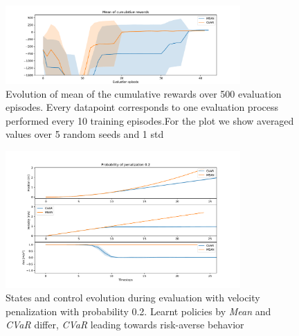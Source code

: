 \begin{figure}[ht]
        \centering
        \includegraphics[width=0.8\textwidth]{images/Car/CVAR/mean_train_withstds.pdf}
        \caption{Evolution of mean of the cumulative rewards over 500 evaluation episodes.
        Every datapoint corresponds
        to one evaluation process performed every 10 training episodes.For the plot we
        show averaged values over 5 random seeds and 1 std}
        \label{fig:mean_car}
    
\end{figure}

\begin{figure}[ht]
        \centering
        \includegraphics[width=0.8\textwidth]{images/Car/CVAR/Trajectory_withstds_penal.pdf}
        \caption{States and control evolution during evaluation with velocity penalization
        with probability 0.2.
        Learnt policies by \textit{Mean} and \textit{CVaR} differ, \textit{CVaR} leading
        towards risk-averse behavior}
        \label{fig:traj_probpenal0.2}
    
\end{figure}


